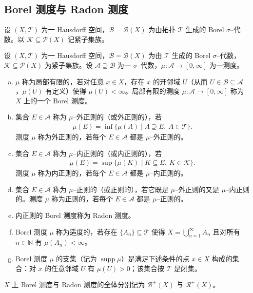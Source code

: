 \documentclass[../../main.tex]{subfiles}%
\begin{document}
\subsection{Borel 测度与 Radon 测度}\label{subsection:ch01-Borel测度}

设 $(X,\mathcal{T})$ 为一 Hausdorff 空间，$\mathcal{B}=\mathcal{B}(X)$ 为由拓扑 $\mathcal{T}$ 生成的 Borel $\sigma$--代数。以 $\mathcal{K}\subseteq\mathcal{P}(X)$ 记紧子集族。

\begin{definition}\label{definition:ch01-Borel测度}
设 $(X,\mathcal{T})$ 为一 Hausdorff 空间，$\mathcal{B}=\mathcal{B}(X)$ 为由 $\mathcal{T}$ 生成的 Borel $\sigma$--代数，$\mathcal{K}\subseteq\mathcal{P}(X)$ 为紧子集族。设 $\mathcal{A}\supseteq\mathcal{B}$ 为一 $\sigma$--代数，$\mu:\mathcal{A}\to[0,\infty]$ 为一测度。
\begin{enumerate}[(a)]
\item $\mu$ 称为局部有限的，若对任意 $x\in X$，存在 $x$ 的开邻域 $U$（从而 $U\in\mathcal{B}\subseteq\mathcal{A}$，$\mu(U)$ 有定义）使得 $\mu(U)<\infty$。局部有限的测度 $\mu:\mathcal{A}\to[0,\infty]$ 称为 $X$ 上的一个 Borel 测度。
\item 集合 $E\in\mathcal{A}$ 称为 $\mu$--外正则的（或外正则的），若
\begin{align*}
\mu(E)=\inf\{\mu(A)\mid A\supseteq E,\ A\in\mathcal{T}\}.
\end{align*}
测度 $\mu$ 称为外正则的，若每个 $E\in\mathcal{A}$ 都是 $\mu$--外正则的。
\item 集合 $E\in\mathcal{A}$ 称为 $\mu$--内正则的（或内正则的），若
\begin{align*}
\mu(E)=\sup\{\mu(K)\mid K\subseteq E,\ K\in\mathcal{K}\}.
\end{align*}
测度 $\mu$ 称为内正则的，若每个 $E\in\mathcal{A}$ 都是 $\mu$--内正则的。
\item 集合 $E\in\mathcal{A}$ 称为 $\mu$--正则的（或正则的），若它既是 $\mu$--外正则的又是 $\mu$--内正则的。测度 $\mu$ 称为正则的，若每个 $E\in\mathcal{A}$ 都是 $\mu$--正则的。
\item 内正则的 Borel 测度称为 Radon 测度。
\item Borel 测度 $\mu$ 称为适度的，若存在 $\{A_n\}\subseteq\mathcal{T}$ 使得 $X=\bigcup_{n=1}^\infty A_n$ 且对所有 $n\in\mathbb{N}$ 有 $\mu(A_n)<\infty$。
\item Borel 测度 $\mu$ 的支集（记为 $\operatorname{supp}\mu$）是满足下述条件的点 $x\in X$ 构成的集合：对 $x$ 的任意邻域 $U$ 有 $\mu(U)>0$；该集合按 $\mathcal{T}$ 是闭集。
\end{enumerate}
$X$ 上 Borel 测度与 Radon 测度的全体分别记为 $\mathcal{B}^+(X)$ 与 $\mathcal{R}^+(X)$。
\end{definition}
\end{document}
